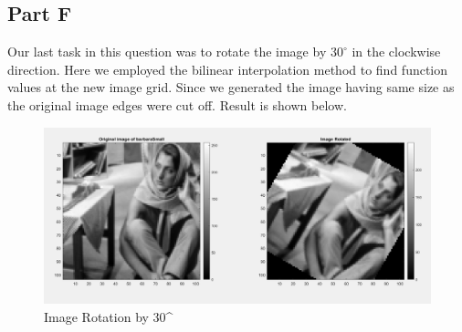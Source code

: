 \documentclass[12pt, a4paper]{article}
\begin{document}
\subsection*{Part F}
Our last task in this question was to rotate the image by $30^{\circ}$ in the clockwise direction. Here we employed the bilinear interpolation method to find function values at the new image grid. Since we generated the image having same size as the original image edges were cut off. Result is shown below.

\begin{figure}[h!]
  \centering
    \includegraphics[scale=0.4]{image_rotation.png}
    \caption{Image Rotation by 30^{\circ}}
  \label{fig:7}
\end{figure}
\end{document}
